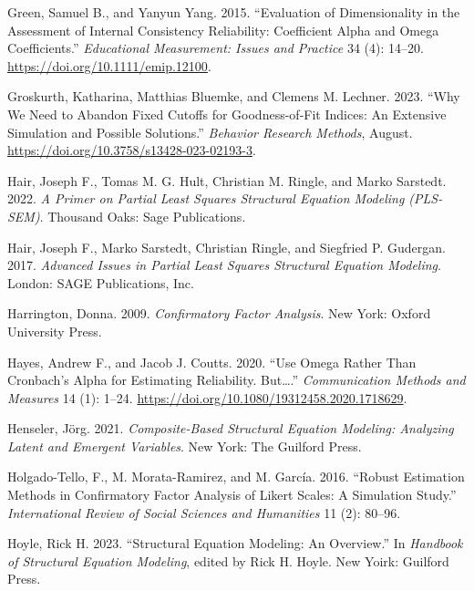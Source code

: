 \documentclass[
  a4paper,
]{article}
\newlength{\cslhangindent}
\newenvironment{CSLReferences}[2] %
 {\begin{list}{}{%
  \setlength{\itemindent}{0pt}
  \setlength{\leftmargin}{0pt}
  \setlength{\parsep}{0pt}
  \ifodd #1
   \setlength{\leftmargin}{\cslhangindent}
   \setlength{\itemindent}{-1\cslhangindent}
  \fi
  \setlength{\itemsep}{#2\baselineskip}}}
 {\end{list}}
\begin{document}
\begin{CSLReferences}{1}{0}
Green, Samuel B., and Yanyun Yang. 2015. {``Evaluation of
{Dimensionality} in the {Assessment} of {Internal Consistency
Reliability}: {Coefficient Alpha} and {Omega Coefficients}.''}
\emph{Educational Measurement: Issues and Practice} 34 (4): 14--20.
\url{https://doi.org/10.1111/emip.12100}.

Groskurth, Katharina, Matthias Bluemke, and Clemens M. Lechner. 2023.
{``Why We Need to Abandon Fixed Cutoffs for Goodness-of-Fit Indices:
{An} Extensive Simulation and Possible Solutions.''} \emph{Behavior
Research Methods}, August.
\url{https://doi.org/10.3758/s13428-023-02193-3}.

Hair, Joseph F., Tomas M. G. Hult, Christian M. Ringle, and Marko
Sarstedt. 2022. \emph{A {Primer} on {Partial Least Squares Structural
Equation Modeling} ({PLS-SEM})}. Thousand Oaks: Sage Publications.

Hair, Joseph F., Marko Sarstedt, Christian Ringle, and Siegfried P.
Gudergan. 2017. \emph{Advanced {Issues} in {Partial Least Squares
Structural Equation Modeling}}. London: SAGE Publications, Inc.

Harrington, Donna. 2009. \emph{Confirmatory {Factor Analysis}}. New
York: Oxford University Press.

Hayes, Andrew F., and Jacob J. Coutts. 2020. {``Use {Omega Rather} Than
{Cronbach}'s {Alpha} for {Estimating Reliability}. {But}{\ldots{}}.''}
\emph{Communication Methods and Measures} 14 (1): 1--24.
\url{https://doi.org/10.1080/19312458.2020.1718629}.

Henseler, Jörg. 2021. \emph{Composite-{Based Structural Equation
Modeling}: {Analyzing Latent} and {Emergent Variables}}. New York: The
Guilford Press.

Holgado-Tello, F., M. Morata-Ramirez, and M. García. 2016. {``Robust
{Estimation Methods} in {Confirmatory Factor} {Analysis} of {Likert
Scales}: {A Simulation Study}.''} \emph{International Review of Social
Sciences and Humanities} 11 (2): 80--96.

Hoyle, Rick H. 2023. {``Structural {Equation Modeling}: {An
Overview}.''} In \emph{Handbook of {Structural Equation Modeling}},
edited by Rick H. Hoyle. New Yoirk: Guilford Press.


\end{CSLReferences}
\end{document}
